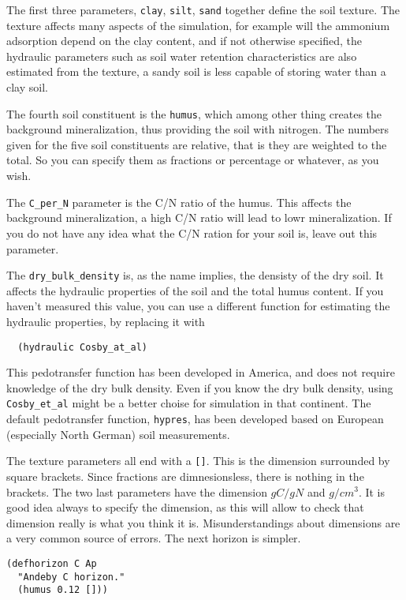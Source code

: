\documentclass[a4paper,11pt]{article}
\begin{document}
The first three parameters, \texttt{clay}, \texttt{silt},
\texttt{sand} together define the soil texture.  The texture affects
many aspects of the simulation, for example will the ammonium
adsorption depend on the clay content, and if not otherwise specified,
the hydraulic parameters such as soil water retention characteristics
are also estimated from the texture, a sandy soil is less capable of
storing water than a clay soil.

The fourth soil constituent is the \texttt{humus}, which among other thing
creates the background mineralization, thus providing the soil with
nitrogen.  The numbers given for the five soil constituents are
relative, that is they are weighted to the total.  So you can specify
them as fractions or percentage or whatever, as you wish.

The \texttt{C\_per\_N} parameter is the C/N ratio of the humus.  This
affects the background mineralization, a high C/N ratio will lead to
lowr mineralization.  If you do not have any idea what the C/N ration
for your soil is, leave out this parameter.

The \texttt{dry\_bulk\_density} is, as the name implies, the densisty
of the dry soil.  It affects the hydraulic properties of the soil and
the total humus content.  If you haven't measured this value, you can
use a different function for estimating the hydraulic properties, by
replacing it with
\begin{verbatim}
  (hydraulic Cosby_at_al)
\end{verbatim}
This pedotransfer function has been developed in America, and does not
require knowledge of the dry bulk density.  Even if you know the dry
bulk density, using \texttt{Cosby\_et\_al} might be a better choise
for simulation in that continent.  The default pedotransfer function,
\texttt{hypres}, has been developed based on European (especially
North German) soil measurements.

The texture parameters all end with a \verb|[]|.  This is the
dimension surrounded by square brackets.  Since fractions are
dimnesionsless, there is nothing in the brackets.  The two last
parameters have the dimension $g C/g N$ and $g/cm^3$.  It is good idea
always to specify the dimension, as this will allow \daisy{} to check
that dimension really is what you think it is.  Misunderstandings
about dimensions are a very common source of errors.  The next horizon
is simpler.

\begin{verbatim}
(defhorizon C Ap
  "Andeby C horizon."
  (humus 0.12 []))
\end{verbatim}
\end{document}
